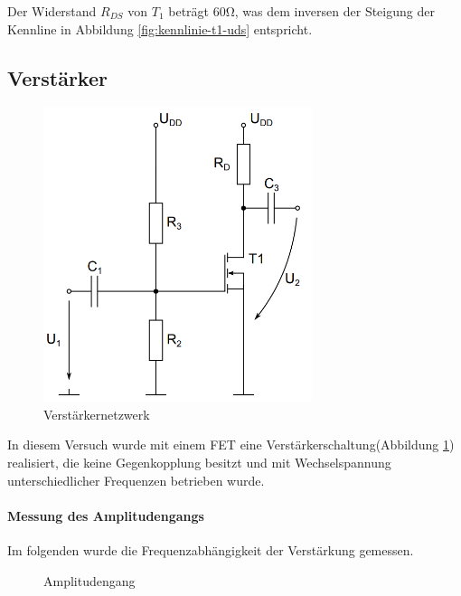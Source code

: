 \documentclass[a4paper]{article}
\begin{document}
Der Widerstand $R_{DS}$ von $T_1$ beträgt $60\si{\ohm}$, was dem inversen der Steigung der Kennline in Abbildung \ref{fig:kennlinie-t1-uds} entspricht.

\subsection{Verstärker}

\begin{figure}[H]
    \centering
    \includegraphics[width=0.7\textwidth]{versuch2/versuch2_aufbau.png}
    \caption{Verstärkernetzwerk}
    \label{fig:versuch2-aufbau}
\end{figure}

In diesem Versuch wurde mit einem FET eine Verstärkerschaltung(Abbildung \ref{fig:versuch2-aufbau}) realisiert, die keine Gegenkopplung besitzt und mit Wechselspannung unterschiedlicher Frequenzen betrieben wurde.

\paragraph{Messung des Amplitudengangs}
Im folgenden wurde die Frequenzabhängigkeit der Verstärkung gemessen.

\begin{figure}[H]
    \centering
    \caption{Amplitudengang}
    \label{fig:verstaerker-amplitude}
\end{figure}
\end{document}
